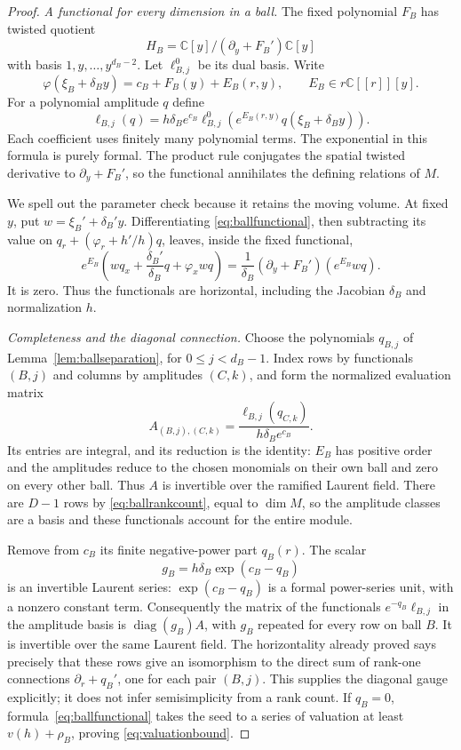 \documentclass[11pt]{article}
\theoremstyle{definition}\newtheorem{definition}[theorem]{Definition}
\theoremstyle{remark}\newtheorem{remark}[theorem]{Remark}
\newcommand{\C}{\mathbb C}
\begin{document}
\begin{proof}
\emph{A functional for every dimension in a ball.}
The fixed polynomial $F_B$ has twisted quotient
\[
 H_B=\C[y]/(\partial_y+F_B')\C[y]
\]
with basis $1,y,\ldots,y^{d_B-2}$. Let $\ell^0_{B,j}$ be its dual
basis. Write
\[
 \varphi(\xi_B+\delta_B y)=c_B+F_B(y)+E_B(r,y),
 \qquad E_B\in r\C[[r]][y].
\]
For a polynomial amplitude $q$ define
\begin{equation}\label{eq:ballfunctional}
 \ell_{B,j}(q)=h\delta_B e^{c_B}
   \ell^0_{B,j}\!\left(e^{E_B(r,y)}q(\xi_B+\delta_B y)\right).
\end{equation}
Each coefficient uses finitely many polynomial terms. The exponential
in this formula is purely formal. The product rule conjugates the
spatial twisted derivative to $\partial_y+F_B'$, so the functional
annihilates the defining relations of $M$.

We spell out the parameter check because it retains the moving volume.
At fixed $y$, put $w=\xi_B'+\delta_B'y$. Differentiating
\eqref{eq:ballfunctional}, then subtracting its value on
$q_r+(\varphi_r+h'/h)q$, leaves, inside the fixed functional,
\[
 e^{E_B}\left(wq_x+\frac{\delta_B'}{\delta_B}q+\varphi_xwq\right)
 =\frac1{\delta_B}(\partial_y+F_B')
                      \left(e^{E_B}wq\right).
\]
It is zero. Thus the functionals are horizontal, including the
Jacobian $\delta_B$ and normalization $h$.

\emph{Completeness and the diagonal connection.}
Choose the polynomials $q_{B,j}$ of
Lemma~\ref{lem:ballseparation}, for $0\leq j<d_B-1$.
Index rows by functionals $(B,j)$ and columns by amplitudes $(C,k)$,
and form the normalized evaluation matrix
\[
 A_{(B,j),(C,k)}=
   \frac{\ell_{B,j}(q_{C,k})}{h\delta_Be^{c_B}}.
\]
Its entries are integral, and its reduction is the identity:
$E_B$ has positive order and the amplitudes reduce to the chosen
monomials on their own ball and zero on every other ball. Thus $A$
is invertible over the ramified Laurent field. There are $D-1$ rows
by \eqref{eq:ballrankcount}, equal to $\dim M$, so the amplitude
classes are a basis and these functionals account for the entire module.

Remove from $c_B$ its finite negative-power part $q_B(r)$.
The scalar
\[
 g_B=h\delta_B\exp(c_B-q_B)
\]
is an invertible Laurent series: $\exp(c_B-q_B)$ is a formal
power-series unit, with a nonzero constant term. Consequently the
matrix of the functionals $e^{-q_B}\ell_{B,j}$ in the amplitude
basis is $\operatorname{diag}(g_B)A$, with $g_B$ repeated for every
row on ball $B$. It is invertible over the same Laurent field.
The horizontality already proved says precisely that these rows
give an isomorphism to the direct sum of rank-one connections
$\partial_r+q_B'$, one for each pair $(B,j)$. This supplies the diagonal
gauge explicitly; it does not infer semisimplicity from a rank count.
If $q_B=0$, formula~\eqref{eq:ballfunctional} takes the seed to a
series of valuation at least $v(h)+\rho_B$, proving
\eqref{eq:valuationbound}.


\end{proof}
\end{document}
